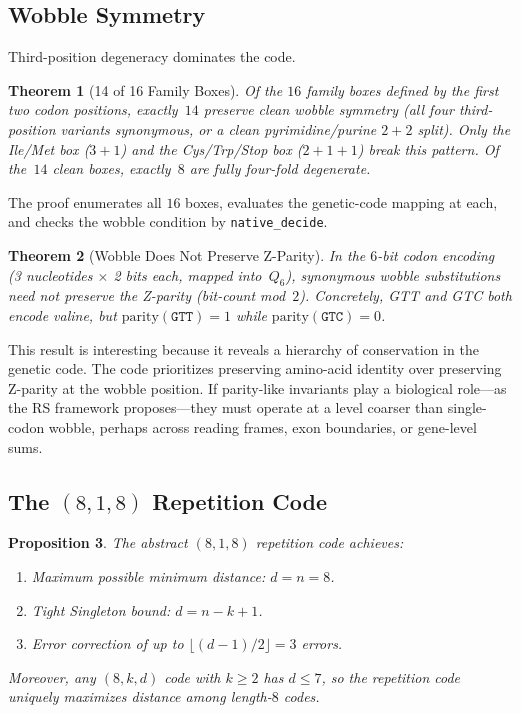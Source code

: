 \documentclass[11pt,a4paper]{article}
\newtheorem{theorem}{Theorem}[section]
\newtheorem{proposition}[theorem]{Proposition}
\newcommand{\Qsix}{\ensuremath{Q_6}}
\begin{document}
\subsection{Wobble Symmetry}

Third-position degeneracy dominates the code.

\begin{theorem}[14 of 16 Family Boxes]
\label{thm:14of16}
Of the $16$ family boxes defined by the first two codon positions, exactly~$14$ preserve clean wobble symmetry (all four third-position variants synonymous, or a clean pyrimidine/purine $2{+}2$ split).  Only the Ile/Met box ($3{+}1$) and the Cys/Trp/Stop box ($2{+}1{+}1$) break this pattern.  Of the~$14$ clean boxes, exactly~$8$ are fully four-fold degenerate.
\end{theorem}

\noindent
The proof enumerates all $16$ boxes, evaluates the genetic-code mapping at each, and checks the wobble condition by \texttt{native\_decide}.

\begin{theorem}[Wobble Does Not Preserve Z-Parity]
\label{thm:wobble-parity}
In the $6$-bit codon encoding (3 nucleotides $\times$ 2 bits each, mapped into~\Qsix), synonymous wobble substitutions need not preserve the Z-parity (bit-count mod~$2$). Concretely, GTT and GTC both encode valine, but $\mathrm{parity}(\texttt{GTT}) = 1$ while $\mathrm{parity}(\texttt{GTC}) = 0$.
\end{theorem}

This result is interesting because it reveals a hierarchy of conservation in the genetic code. The code prioritizes preserving amino-acid identity over preserving Z-parity at the wobble position. If parity-like invariants play a biological role---as the RS framework proposes---they must operate at a level coarser than single-codon wobble, perhaps across reading frames, exon boundaries, or gene-level sums.

\subsection{The $(8,1,8)$ Repetition Code}

\begin{proposition}
\label{prop:818}
The abstract $(8,1,8)$ repetition code achieves:
\begin{enumerate}[nosep]
\item Maximum possible minimum distance: $d = n = 8$.
\item Tight Singleton bound: $d = n - k + 1$.
\item Error correction of up to $\lfloor(d-1)/2\rfloor = 3$ errors.
\end{enumerate}
Moreover, any $(8,k,d)$ code with $k \geq 2$ has $d \leq 7$, so the repetition code uniquely maximizes distance among length-$8$ codes.
\end{proposition}
\end{document}
